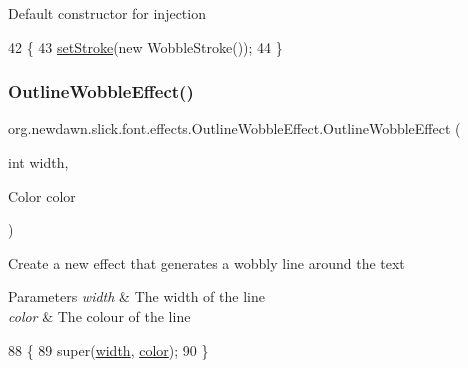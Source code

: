 Default constructor for injection 
\begin{DoxyCode}
42                                   \{
43         \mbox{\hyperlink{classorg_1_1newdawn_1_1slick_1_1font_1_1effects_1_1_outline_effect_aaea80188301a66f869e1a6e3d5cd5cf7}{setStroke}}(\textcolor{keyword}{new} WobbleStroke());
44     \}
\end{DoxyCode}
\mbox{\label{classorg_1_1newdawn_1_1slick_1_1font_1_1effects_1_1_outline_wobble_effect_a028ffb20ed8d507e1c2db11328a3b0da}} 
\subsubsection{\texorpdfstring{Outline\+Wobble\+Effect()}{OutlineWobbleEffect()}\hspace{0.1cm}{\footnotesize\ttfamily [2/2]}}
{\footnotesize\ttfamily org.\+newdawn.\+slick.\+font.\+effects.\+Outline\+Wobble\+Effect.\+Outline\+Wobble\+Effect (\begin{DoxyParamCaption}\item[{int}]{width,  }\item[{Color}]{color }\end{DoxyParamCaption})\hspace{0.3cm}{\ttfamily [inline]}}

Create a new effect that generates a wobbly line around the text


\begin{DoxyParams}{Parameters}
{\em width} & The width of the line \\
\hline
{\em color} & The colour of the line \\
\hline
\end{DoxyParams}

\begin{DoxyCode}
88                                                         \{
89         super(\mbox{\hyperlink{classorg_1_1newdawn_1_1slick_1_1font_1_1effects_1_1_outline_effect_aad96e33c4fb5804e7423df04e1cc1936}{width}}, \mbox{\hyperlink{classorg_1_1newdawn_1_1slick_1_1font_1_1effects_1_1_outline_effect_a00160c4c005cb659d45c135a2798005f}{color}});
90     \}
\end{DoxyCode}


